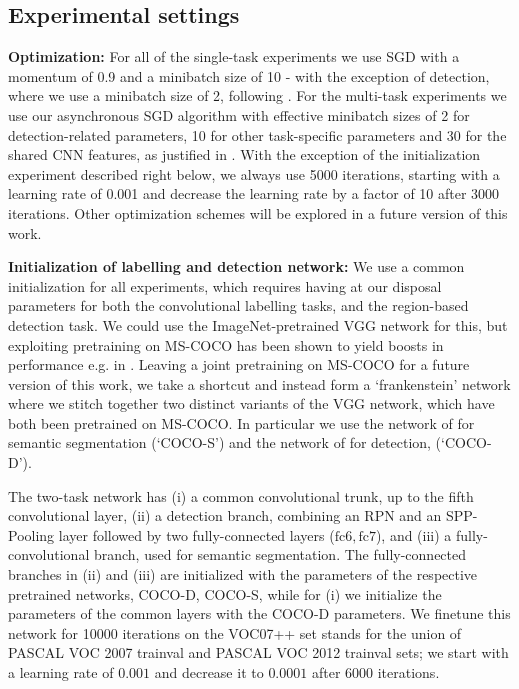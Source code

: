 \documentclass[10pt,twocolumn,letterpaper]{article}
\begin{document}
 
 
 \subsection{Experimental settings}
 \label{settings}
 \textbf{Optimization: } For all of the single-task experiments  we use SGD with a momentum of 0.9 and a minibatch size of 10 - with the exception of detection, where we use a minibatch size of 2, following \cite{Girshick15}.  For the multi-task experiments we use our asynchronous SGD algorithm with effective minibatch sizes of 2 for detection-related parameters, 10 for other task-specific parameters and 30 for the shared CNN features, as justified in . 
 With the exception of the initialization experiment described right below, we always use 5000 iterations, starting with a learning rate of 0.001 and decrease the learning rate by a factor of 10 after 3000 iterations. Other optimization schemes will be explored in a future version of this work.
 
  
\textbf{Initialization of labelling and detection network:}
We  use a common initialization for all experiments, which requires having at our disposal parameters for both the convolutional labelling tasks, and the region-based detection task. We could use the ImageNet-pretrained VGG network for this, but exploiting pretraining on MS-COCO has been shown to yield boosts in performance e.g. in \cite{ChenPK0Y16,Girshick15}. Leaving a joint pretraining on MS-COCO for a future version of this work, we take a shortcut and instead form a `frankenstein' network  where we stitch together two distinct  variants of the VGG network, which have both been pretrained on MS-COCO. In particular we use the network of \cite{ChenPK0Y16} for semantic segmentation (`COCO-S') and the network of \cite{Girshick15} for detection, (`COCO-D'). 
 
The two-task network has (i) a common convolutional trunk, up to the fifth convolutional layer, (ii) a detection branch, combining an RPN and an SPP-Pooling layer followed by two fully-connected layers ($\mathrm{fc6,fc7}$), and (iii) a fully-convolutional branch, used for semantic segmentation. The fully-connected  branches  in (ii) and (iii) are initialized with the parameters of the respective pretrained networks, COCO-D, COCO-S, while for (i) we initialize the parameters of the common layers with the COCO-D parameters.  We finetune this network for 10000 iterations on the VOC07++ set \cite{Girshick15}  stands for  the union of PASCAL VOC 2007 trainval and PASCAL VOC 2012 trainval sets; we start with a learning rate of $0.001$ and decrease it to $0.0001$ after 6000 iterations.
\end{document}
